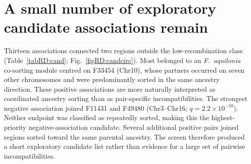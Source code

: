 \documentclass[11pt]{article}
\begin{document}
\section{A small number of exploratory candidate associations remain}\label{srD:candidates}

Thirteen associations connected two regions outside the low-recombination class
(Table~\ref{tabRD:cand}; Fig.~\ref{figRD:candcirc}). Most belonged to an
\emph{F.\ aquilonia} co-sorting module centred on F33454 (Chr10), whose partners occurred on
seven other chromosomes and were predominantly sorted in the same ancestry direction. These
positive associations are more naturally interpreted as coordinated ancestry sorting than as
pair-specific incompatibilities. The strongest negative association joined F11431 and F49480
(Chr3--Chr16; $q=2.2\times10^{-10}$). Neither endpoint was classified as repeatedly sorted,
making this the highest-priority negative-association candidate. Several additional positive
pairs joined regions sorted toward the same parental ancestry. The screen therefore produced
a short exploratory candidate list rather than evidence for a large set of pairwise
incompatibilities.
\end{document}
